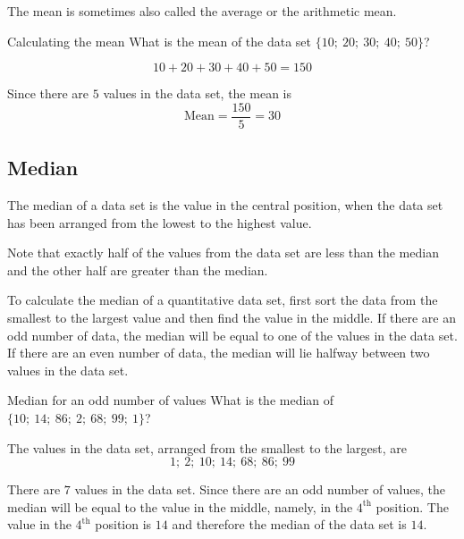 The mean is sometimes also called the average or the arithmetic mean.
\par
{}
\begin{wex}{Calculating the mean}
{What is the mean of the data set $\{10;\ 20;\ 30;\ 40;\ 50\}$?}
{
  \begin{equation*}
    10 + 20 + 30 + 40 + 50 = 150
  \end{equation*}


  Since there are $5$ values in the data set, the mean is
  \begin{equation*}
    \mbox{Mean} = \frac{150}{5} = 30
  \end{equation*}
}
\end{wex}

\subsection{Median}
{The median of a data set is the value in the
  central position, when the data set has been arranged from the
  lowest to the highest value.}

Note that exactly half of the values from the data set are less than
  the median and the other half are greater than the median.\par

To calculate the median of a quantitative data set, first sort the
data from the smallest to the largest value and then find the value in
the middle. If there are an odd number of data, the median will be
equal to one of the values in the data set. If there are an even
number of data, the median will lie halfway between two values in
the data set.

\begin{wex}{Median for an odd number of values}
{What is the median of $\{10;\ 14;\ 86;\ 2;\ 68;\ 99;\ 1\}$?}
{

  The values in the data set, arranged from the smallest to the largest, are
  \begin{equation*}
    1;\ 2;\ 10;\ 14;\ 68;\ 86;\ 99
  \end{equation*}


  There are $7$ values in the data set. Since there are an odd number
  of values, the median will be equal to the value in the middle,
  namely, in the $4^{\mathrm{th}}$ position. The value in the $4^{\mathrm{th}}$ position is
  $14$ and therefore the median of the data set is $14$.
}
\end{wex}

